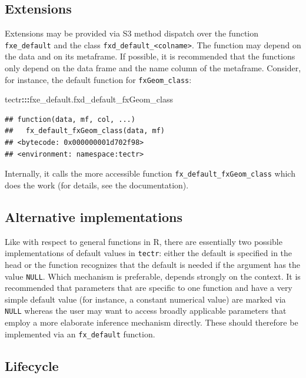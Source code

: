 \documentclass[]{report}
\newenvironment{Shaded}{\begin{snugshade}}{\end{snugshade}}
\newcommand{\OperatorTok}[1]{\textcolor[rgb]{0.81,0.36,0.00}{\textbf{#1}}}
\newcommand{\NormalTok}[1]{#1}
\theoremstyle{definition}
\theoremstyle{definition}
\theoremstyle{definition}
\theoremstyle{remark}
\begin{document}
\subsection{Extensions}\label{extensions}

Extensions may be provided via S3 method dispatch over the function
\texttt{fxe\_default} and the class
\texttt{fxd\_default\_\textless{}colname\textgreater{}}. The function
may depend on the data and on its metaframe. If possible, it is
recommended that the functions only depend on the data frame and the
name column of the metaframe. Consider, for instance, the default
function for \texttt{fxGeom\_class}:

\begin{Shaded}
\begin{Highlighting}[]
\NormalTok{tectr}\OperatorTok{:::}\NormalTok{fxe_default.fxd_default_fxGeom_class}
\end{Highlighting}
\end{Shaded}

\begin{verbatim}
## function(data, mf, col, ...)
##   fx_default_fxGeom_class(data, mf)
## <bytecode: 0x000000001d702f98>
## <environment: namespace:tectr>
\end{verbatim}

Internally, it calls the more accessible function
\texttt{fx\_default\_fxGeom\_class} which does the work (for details,
see the documentation).

\subsection{Alternative
implementations}\label{alternative-implementations}

Like with respect to general functions in R, there are essentially two
possible implementations of default values in \texttt{tectr}: either the
default is specified in the head or the function recognizes that the
default is needed if the argument has the value \texttt{NULL}. Which
mechanism is preferable, depends strongly on the context. It is
recommended that parameters that are specific to one function and have a
very simple default value (for instance, a constant numerical value) are
marked via \texttt{NULL} whereas the user may want to access broadly
applicable parameters that employ a more elaborate inference mechanism
directly. These should therefore be implemented via an
\texttt{fx\_default} function.

\subsection{Lifecycle}\label{lifecycle}
\end{document}
